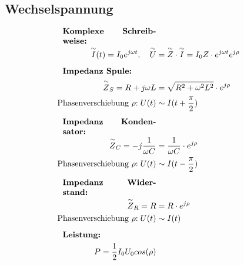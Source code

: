 \subsection{Wechselspannung}
    \vspace{-1em}
    \begin{align*}
        \parbox{4cm}{\textbf{Komplexe Schreibweise:}}\\
        \overset{\sim}{I}(t) = I_0 e^{j \omega t}, \quad \overset{\sim}{U} &= \overset{\sim}{Z} \cdot \overset{\sim}{I} = I_0 Z \cdot e^{j \omega t} e^{j \rho}
        \\[0.5em]
        \parbox{4cm}{\textbf{Impedanz Spule:}}\\
        \overset{\sim}{Z}_S = R + j \omega L &= \sqrt{R^2 + \omega^2 L ^2} \cdot e^{j \rho}\\
        \text{Phasenverschiebung $\rho$:} \; U(t) &\sim I(t + \frac{\pi}{2})
        \\[0.5em]
        \parbox{4cm}{\textbf{Impedanz Kondensator:}}\\
        \overset{\sim}{Z}_C = - j\frac{1}{\omega C} &= \frac{1}{\omega C} \cdot e^{j \rho}\\
        \text{Phasenverschiebung $\rho$:} \; U(t) &\sim I(t - \frac{\pi}{2})
        \\[0.5em]
        \parbox{4cm}{\textbf{Impedanz Widerstand:}}\\
        \overset{\sim}{Z}_R = R &= R \cdot e^{j \rho}\\
        \text{Phasenverschiebung $\rho$:} \; U(t) &\sim I(t)
        \\[0.5em]
        \parbox{4cm}{\textbf{Leistung:}}\\
        P = \frac{1}{2} I_0 U_0 cos(\rho)
    \end{align*}



